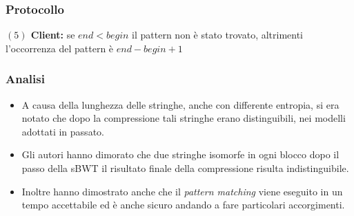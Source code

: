 \documentclass{beamer}
\begin{document}
\begin{frame}
\frametitle{Protocollo}
\textbf{$(5)$ Client:} se $end < begin$ il pattern non è stato trovato, altrimenti l'occorrenza del pattern è $end - begin +1$
\end{frame}
\begin{frame}
\frametitle{Analisi}
\begin{itemize}
	\item A causa della lunghezza delle stringhe, anche con differente entropia, si era notato che dopo la compressione tali stringhe erano distinguibili, nei modelli adottati in passato.\pause
	\item Gli autori hanno dimorato che  due stringhe isomorfe in ogni blocco dopo il passo della sBWT il risultato finale della compressione risulta indistinguibile.\pause
	\item Inoltre hanno dimostrato anche che il \textit{pattern matching} viene eseguito in un tempo accettabile ed è anche sicuro andando a fare particolari accorgimenti. 
\end{itemize}
\end{frame}

\end{document}
